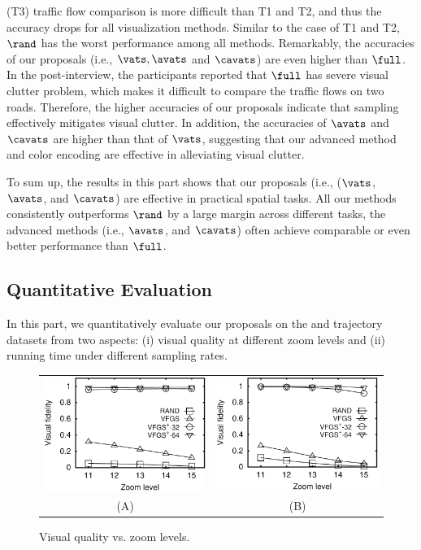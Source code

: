 (T3) traffic flow comparison is more difficult than T1 and T2, and thus the accuracy drops for all visualization methods. Similar to the case of T1 and T2, $\rand$ has the worst performance among all methods. Remarkably, the accuracies of our proposals (i.e.,  $\vats,\avats$ and $\cavats$) are even higher than $\full$. In the post-interview, the participants reported that $\full$ has severe visual clutter problem, which makes it difficult to compare the traffic flows on two roads. Therefore, the higher accuracies of our proposals indicate that sampling effectively mitigates visual clutter. In addition, the accuracies of $\avats$ and $\cavats$ are higher than that of $\vats$, suggesting that our advanced method and color encoding are effective in alleviating visual clutter.

To sum up, the results in this part shows that our proposals (i.e., ($\vats$, $\avats$, and $\cavats$) are effective in practical spatial tasks. All our methods consistently outperforms $\rand$ by a large margin across different tasks, the advanced methods (i.e., $\avats$, and $\cavats$) often achieve comparable or even better performance than  $\full$.

\subsection{Quantitative Evaluation}\label{sec:quality}
In this part, we quantitatively evaluate our proposals on the \pt{} and \sz{} trajectory datasets from two aspects:
(i) visual quality at different zoom levels
and (ii) running time under different sampling rates.

\begin{figure}
 \centering
 \small
 \begin{tabular}{cc}
   \includegraphics[width=0.44\columnwidth]{pictures/fporto}
   &
   \includegraphics[width=0.44\columnwidth]{pictures/fshenzhen}
   \\
   (A) \pt{}
   &
   (B) \sz{}
 \end{tabular}
 \vspace{-3mm}
 \caption{Visual quality vs. zoom levels.}
 \label{fig:quality}
 \vspace{-3mm}
\end{figure}

